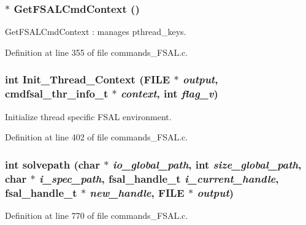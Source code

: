 \subsubsection[{GetFSALCmdContext}]{$\ast$ GetFSALCmdContext ()}\label{commands__FSAL_8c_992f9fbc20f25850200bd52f03264bdf}


GetFSALCmdContext : manages pthread\_\-keys. 

Definition at line 355 of file commands\_\-FSAL.c.
\subsubsection[{Init\_\-Thread\_\-Context}]{\setlength{\rightskip}{0pt plus 5cm}int Init\_\-Thread\_\-Context (FILE $\ast$ {\em output}, \/  {\bf cmdfsal\_\-thr\_\-info\_\-t} $\ast$ {\em context}, \/  int {\em flag\_\-v})}\label{commands__FSAL_8c_62d7f2806ded1d6e99e33114e4e445c8}


Initialize thread specific FSAL environment. 

Definition at line 402 of file commands\_\-FSAL.c.
\subsubsection[{solvepath}]{\setlength{\rightskip}{0pt plus 5cm}int solvepath (char $\ast$ {\em io\_\-global\_\-path}, \/  int {\em size\_\-global\_\-path}, \/  char $\ast$ {\em i\_\-spec\_\-path}, \/  fsal\_\-handle\_\-t {\em i\_\-current\_\-handle}, \/  fsal\_\-handle\_\-t $\ast$ {\em new\_\-handle}, \/  FILE $\ast$ {\em output})}\label{commands__FSAL_8c_52fc69129efee557919082cf79bd643c}




Definition at line 770 of file commands\_\-FSAL.c.